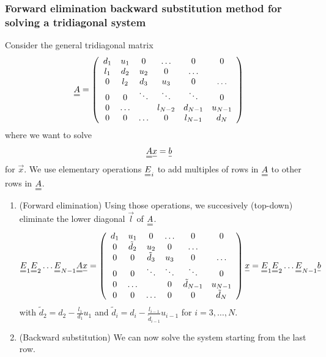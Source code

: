 
\subsubsection{Forward elimination backward substitution method for solving a tridiagonal system}
Consider the general tridiagonal matrix
\begin{equation}
    \mat{A} = \left( \begin{array}{cccccc}
        d_1 & u_1 & 0 & \dots & 0 & 0 \\
        l_1 & d_2 & u_2 & 0 & \dots &  \\
        0 & l_2 & d_3 & u_3 & 0 & \dots \\
        0 & 0 & \ddots & \ddots & \ddots & 0 \\
        0 & \dots &  & l_{N-2} & d_{N-1} & u_{N-1} \\
        0 & 0 & \dots & 0 & l_{N-1} & d_N
    \end{array} \right)
\end{equation}
where we want to solve
\begin{equation}
    \mat{A} \vec{x} = \vec{b}
\end{equation}
for $\vec{x}$.
We use elementary operations $\mat{E}_i$ to add multiples of rows in $\mat{A}$ to other rows in $\mat{A}$.
\begin{enumerate}
    \item (\textcolor{blue1}{Forward elimination}) Using those operations, we succesively (top-down) eliminate the
    lower diagonal $\vec{l}$ of $\mat{A}$.
    \begin{equation}
        \mat{E}_1 \mat{E}_2 \dots \mat{E}_{N-1} \mat{A} \vec{x} = \left( \begin{array}{cccccc}
            d_1 & u_1 & 0 & \dots & 0 & 0 \\
            0 & \tilde{d}_2 & u_2 & 0 & \dots &  \\
            0 & 0 & \tilde{d}_3 & u_3 & 0 & \dots \\
            0 & 0 & \ddots & \ddots & \ddots & 0 \\
            0 & \dots &  & 0 & \tilde{d}_{N-1} & u_{N-1} \\
            0 & 0 & \dots & 0 & 0 & \tilde{d}_N
        \end{array} \right) \vec{x} = \mat{E}_1 \mat{E}_2 \dots \mat{E}_{N-1} \vec{b}
    \end{equation}
    with $\tilde{d}_2 = d_2 - \frac{l_1}{d_1} u_1$ and $\tilde{d}_i = d_i - \frac{l_{i-1}}{\tilde{d}_{i-1}} u_{i-1}$ for $i=3,\dots,N$.
    \item (\textcolor{blue1}{Backward substitution}) We can now solve the system starting from the last row.
\end{enumerate}

